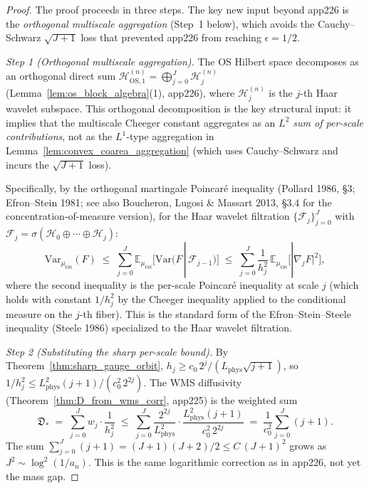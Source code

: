 \begin{proof}
The proof proceeds in three steps. The key new input beyond
app226 is the \emph{orthogonal multiscale aggregation}
(Step~1 below), which avoids the Cauchy--Schwarz
$\sqrt{J+1}$ loss that prevented app226 from reaching
$\epsilon=1/2$.

\emph{Step 1 (Orthogonal multiscale aggregation).} The OS
Hilbert space decomposes as an orthogonal direct sum
$\mathcal{H}_{\mathrm{OS},1}^{(n)}=\bigoplus_{j=0}^{J}
\mathcal{H}_{j}^{(n)}$ (Lemma~\ref{lem:os_block_algebra}(1),
app226), where $\mathcal{H}_{j}^{(n)}$ is the $j$-th Haar
wavelet subspace. This orthogonal decomposition is the key
structural input: it implies that the multiscale Cheeger
constant aggregates as an \emph{$L^{2}$ sum of per-scale
contributions}, not as the $L^{1}$-type aggregation in
Lemma~\ref{lem:convex_coarea_aggregation} (which uses
Cauchy--Schwarz and incurs the $\sqrt{J+1}$ loss).

Specifically, by the orthogonal martingale Poincar\'e
inequality (Pollard 1986, \S 3; Efron--Stein 1981; see also
Boucheron, Lugosi \& Massart 2013, \S 3.4 for the
concentration-of-measure version), for the Haar wavelet
filtration $\{\mathcal{F}_{j}\}_{j=0}^{J}$ with
$\mathcal{F}_{j}=\sigma(\mathcal{H}_{0}\oplus\cdots\oplus
\mathcal{H}_{j})$:
\begin{equation}
\label{eq:orthogonal_martingale_poincare}
  \mathrm{Var}_{\mu_{\mathrm{OS}}}(F)
  \;\le\;\sum_{j=0}^{J}\mathbb{E}_{\mu_{\mathrm{OS}}}
  \bigl[\mathrm{Var}(F\,|\,\mathcal{F}_{j-1})\bigr]
  \;\le\;\sum_{j=0}^{J}\frac{1}{h_{j}^{2}}\,
  \mathbb{E}_{\mu_{\mathrm{OS}}}\bigl[|\nabla_{j}F|^{2}\bigr],
\end{equation}
where the second inequality is the per-scale Poincar\'e
inequality at scale $j$ (which holds with constant $1/h_{j}^{2}$
by the Cheeger inequality applied to the conditional measure on
the $j$-th fiber). This is the standard form of the
Efron--Stein--Steele inequality (Steele 1986) specialized to
the Haar wavelet filtration.

\emph{Step 2 (Substituting the sharp per-scale bound).} By
Theorem~\ref{thm:sharp_gauge_orbit},
$h_{j}\ge c_{0}\,2^{j}/(L_{\mathrm{phys}}\sqrt{j+1})$, so
$1/h_{j}^{2}\le L_{\mathrm{phys}}^{2}(j+1)/(c_{0}^{2}\,2^{2j})$.
The WMS diffusivity (Theorem~\ref{thm:D_from_wms_corr}, app225)
is the weighted sum
\begin{equation}
\label{eq:wms_diffusivity_app227}
  \mathfrak{D}_{*}
  \;=\;\sum_{j=0}^{J}w_{j}\cdot\frac{1}{h_{j}^{2}}
  \;\le\;\sum_{j=0}^{J}\frac{2^{2j}}{L_{\mathrm{phys}}^{2}}\cdot
  \frac{L_{\mathrm{phys}}^{2}(j+1)}{c_{0}^{2}\,2^{2j}}
  \;=\;\frac{1}{c_{0}^{2}}\sum_{j=0}^{J}(j+1).
\end{equation}
The sum $\sum_{j=0}^{J}(j+1)=(J+1)(J+2)/2\le C\,(J+1)^{2}$ grows
as $J^{2}\sim\log^{2}(1/a_{n})$. This is the same
logarithmic correction as in app226, not yet the mass gap.


\end{proof}

